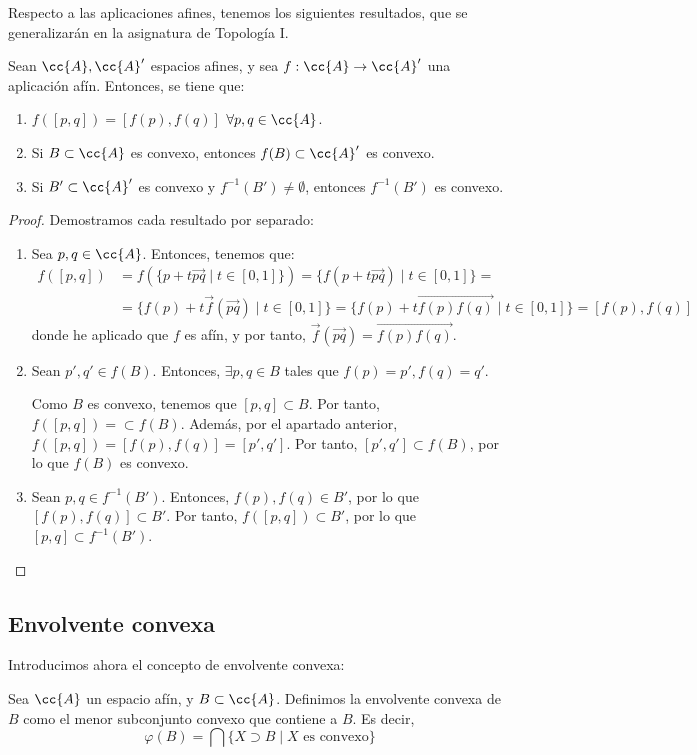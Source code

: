 Respecto a las aplicaciones afines, tenemos los siguientes resultados, que se generalizarán en la asignatura de Topología I.
\begin{prop}
    Sean $\cc{A},\cc{A}'$ espacios afines, y sea $f:\cc{A}\to \cc{A}'$ una aplicación afín. Entonces, se tiene que:
    \begin{enumerate}
        \item $f([p,q])=[f(p),f(q)]$ \qquad $\forall p,q\in \cc{A}$.
        \item Si $B\subset \cc{A}$ es convexo, entonces $f(B)\subset \cc{A}'$ es convexo.
        \item Si $B'\subset \cc{A}'$ es convexo y $f^{-1}(B')\neq \emptyset$, entonces $f^{-1}(B')$ es convexo.
    \end{enumerate}
\end{prop}
\begin{proof}
    Demostramos cada resultado por separado:
    \begin{enumerate}
        \item Sea $p,q\in \cc{A}$. Entonces, tenemos que:
        \begin{equation*}
            \begin{split}
                f([p,q]) &= f(\{p+t\vec{pq}\mid t\in [0,1]\}) = \{f(p+t\vec{pq})\mid t\in [0,1]\} =\\&= \{f(p)+t\vec{f}(\vec{pq})\mid t\in [0,1]\}
            = \{f(p)+t\vec{f(p)f(q)}\mid t\in [0,1]\} = [f(p),f(q)]
            \end{split}
        \end{equation*}
        donde he aplicado que $f$ es afín, y por tanto, $\vec{f}(\vec{pq})=\vec{f(p)f(q)}$.

        \item Sean $p',q'\in f(B)$. Entonces, $\exists p,q\in B$ tales que $f(p)=p', f(q)=q'$.
        
        Como $B$ es convexo, tenemos que $[p,q]\subset B$. Por tanto, $f([p,q])=\subset f(B)$. Además, por el apartado anterior, $f([p,q])=[f(p),f(q)]=[p',q']$. Por tanto, $[p',q']\subset f(B)$, por lo que $f(B)$ es convexo.

        \item Sean $p,q\in f^{-1}(B')$. Entonces, $f(p),f(q)\in B'$, por lo que $[f(p),f(q)]\subset B'$. Por tanto, $f([p,q])\subset B'$, por lo que $[p,q]\subset f^{-1}(B')$.
    \end{enumerate}
\end{proof}


\subsection{Envolvente convexa}
Introducimos ahora el concepto de envolvente convexa:
\begin{definicion}
    Sea $\cc{A}$ un espacio afín, y $B\subset \cc{A}$. Definimos la envolvente convexa de $B$ como el menor subconjunto convexo que contiene a $B$. Es decir,
    \begin{equation*}
        \varphi(B)=\bigcap \{X\supset B\mid X\text{ es convexo}\}
    \end{equation*}
\end{definicion}

